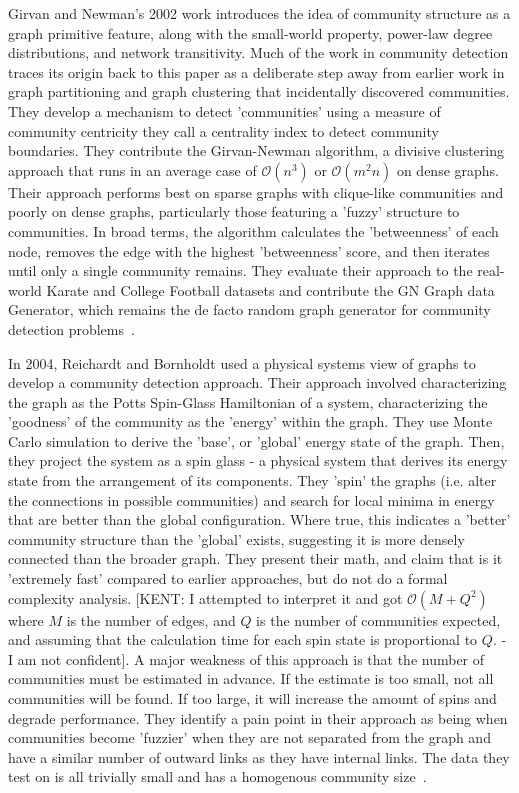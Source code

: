 \par{Girvan and Newman's 2002 work introduces the idea of community structure as a graph primitive feature, along with the small-world property, power-law degree distributions, and network transitivity. 
Much of the work in community detection traces its origin back to this paper as a deliberate step away from earlier work in graph partitioning and graph clustering that incidentally discovered communities. 
They develop a mechanism to detect 'communities' using a measure of community centricity they call a centrality index to detect community boundaries. 
They contribute the Girvan-Newman algorithm, a divisive clustering approach that runs in an average case of $\mathcal{O}(n^3)$ or $\mathcal{O}(m^2n)$ on dense graphs. 
Their approach performs best on sparse graphs with clique-like communities and poorly on dense graphs, particularly those featuring a 'fuzzy' structure to communities. 
In broad terms, the algorithm calculates the 'betweenness' of each node, removes the edge with the highest 'betweenness' score, and then iterates until only a single community remains. 
They evaluate their approach to the real-world Karate and College Football datasets and contribute the GN Graph data Generator, which remains the de facto random graph generator for community detection problems~\cite{Girvan2002}.}

\par{In 2004, Reichardt and Bornholdt used a physical systems view of graphs to develop a community detection approach. 
 Their approach involved characterizing the graph as the Potts Spin-Glass Hamiltonian of a system, characterizing the 'goodness' of the community as the 'energy' within the graph. 
 They use Monte Carlo simulation to derive the 'base', or 'global' energy state of the graph. 
 Then, they project the system as a spin glass - a physical system that derives its energy state from the arrangement of its components. 
 They 'spin' the graphs (i.e. alter the connections in possible communities) and search for local minima in energy that are better than the global configuration. 
 Where true, this indicates a 'better' community structure than the 'global' exists, suggesting it is more densely connected than the broader graph.
  They present their math, and claim that is it 'extremely fast' compared to earlier approaches, but do not do a formal complexity analysis. [KENT: I attempted to interpret it and got $\mathcal{O}(M+Q^2)$ where $M$ is the number of edges, and $Q$ is the number of communities expected, and assuming that the calculation time for each spin state is proportional to $Q$. - I am not confident]. 
  A major weakness of this approach is that the number of communities must be estimated in advance. 
  If the estimate is too small, not all communities will be found. If too large, it will increase the amount of spins and degrade performance. 
  They identify a pain point in their approach as being when communities become 'fuzzier' when they are not separated from the graph and have a similar number of outward links as they have internal links. 
  The data they test on is all trivially small and has a homogenous community size~\cite{Reichardt2004}.}


